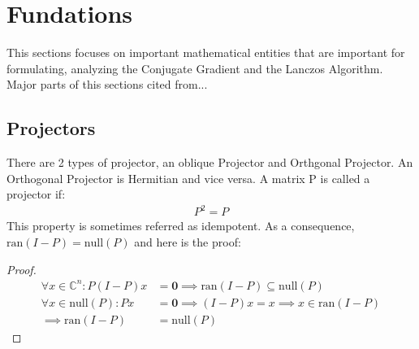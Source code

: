 \documentclass[]{article}
\theoremstyle{definition}
\begin{document}
\section{Fundations}
    This sections focuses on important mathematical entities that are important for formulating, analyzing the Conjugate Gradient and the Lanczos Algorithm. Major parts of this sections cited from... 

    \subsection{Projectors}
        There are 2 types of projector, an oblique Projector and Orthgonal Projector. An Orthogonal Projector is Hermitian and vice versa. A matrix P is called a projector if: 
        \begin{align}
            P^2 = P
        \end{align}
        This property is sometimes referred as idempotent. As a consequence, $\text{ran}(I - P) = \text{null}(P)$ and here is the proof: 
        \begin{proof}
            \begin{align}
                \forall x \in \mathbb{C}^n: P(I - P)x &= \mathbf{0} \implies \text{ran}(I - P)\subseteq \text{null}(P)
                \\
                \forall x \in \text{null}(P): Px &= \mathbf{0} \implies (I - P)x = x \implies x \in \text{ran}(I - P)
                \\
                \implies \text{ran}(I - P) &= \text{null}(P)
                \label{a:1.1.4}
            \end{align}
        \end{proof}
        
\end{document}
